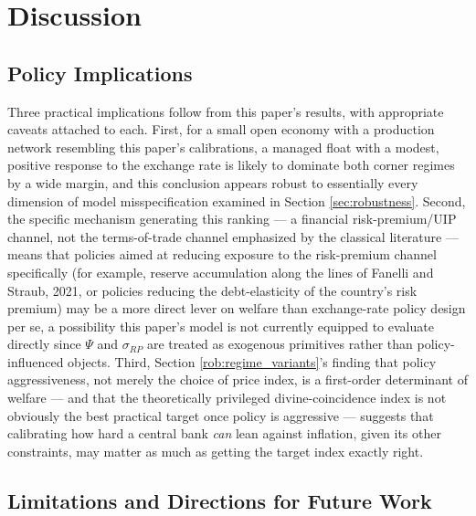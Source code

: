 \documentclass[12pt]{article}
\begin{document}
\section{Discussion}
\label{sec:discussion}

\subsection{Policy Implications}

Three practical implications follow from this paper's results, with appropriate caveats attached to
each. First, for a small open economy with a production network resembling this paper's calibrations,
a managed float with a modest, positive response to the exchange rate is likely to dominate both
corner regimes by a wide margin, and this conclusion appears robust to essentially every dimension of
model misspecification examined in Section \ref{sec:robustness}. Second, the specific mechanism
generating this ranking --- a financial risk-premium/UIP channel, not the terms-of-trade channel
emphasized by the classical literature --- means that policies aimed at reducing exposure to the
risk-premium channel specifically (for example, reserve accumulation along the lines of Fanelli and
Straub, 2021, or policies reducing the debt-elasticity of the country's risk premium) may be a more
direct lever on welfare than exchange-rate policy design per se, a possibility this paper's model is
not currently equipped to evaluate directly since $\Psi$ and $\sigma_{RP}$ are treated as exogenous
primitives rather than policy-influenced objects. Third, Section \ref{rob:regime_variants}'s finding
that policy aggressiveness, not merely the choice of price index, is a first-order determinant of
welfare --- and that the theoretically privileged divine-coincidence index is not obviously the best
practical target once policy is aggressive --- suggests that calibrating how hard a central bank
\emph{can} lean against inflation, given its other constraints, may matter as much as getting the
target index exactly right.

\subsection{Limitations and Directions for Future Work}
\end{document}
